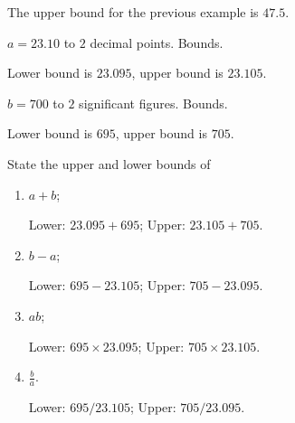 \documentclass[8pt]{article}
\begin{document}
			\defi {} The upper bound for the previous example is \(47.5\).\newline

			\prob \(a = 23.10\) to \(2\) decimal points. Bounds.

			\solution Lower bound is \(23.095\), upper bound is \(23.105\).\newline

			\prob \(b=700\) to \(2\) significant figures. Bounds.

			\solution Lower bound is \(695\), upper bound is \(705\).\newline

			\prob State the upper and lower bounds of

			\begin{enumerate}[label=\probword{(\arabic*)}]
				\item \(a+b\);
				
				\solution Lower: \(23.095 + 695\); Upper: \(23.105 + 705\).

				\item \(b-a\);
				
				\solution Lower: \(695 - 23.105\); Upper: \(705 - 23.095\).

				\item \(ab\);
				
				\solution Lower: \(695 \times 23.095\); Upper: \(705 \times 23.105\).

				\item \(\frac{b}{a}\).
				
				\solution Lower: \(695 / 23.105\); Upper: \(705 / 23.095\).
			\end{enumerate}
\end{document}

